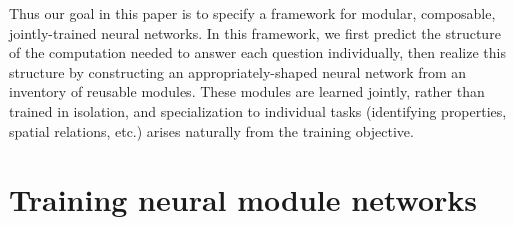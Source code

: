 \documentclass[10pt,twocolumn,letterpaper]{article}
\begin{document}
Thus our goal in this paper is to specify a framework for modular, composable,
jointly-trained neural networks. In this framework, we first predict the
structure of the computation needed to answer each question individually, then
realize this structure by constructing an appropriately-shaped neural network
from an inventory of reusable modules. These modules are learned jointly, rather
than trained in isolation, and specialization to individual tasks (identifying
properties, spatial relations, etc.) arises naturally from the training
objective.

%





\section{Training neural module networks}
\end{document}
